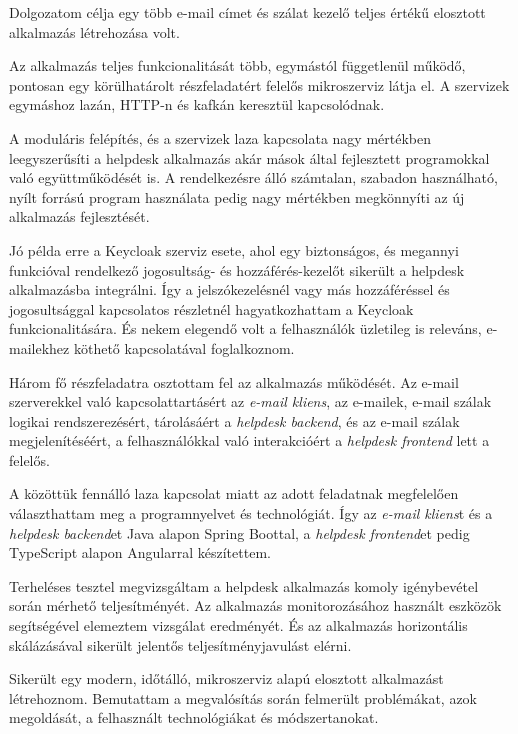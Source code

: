 Dolgozatom célja egy több e-mail címet és szálat kezelő teljes értékű elosztott alkalmazás létrehozása volt.

\bigskip
Az alkalmazás teljes funkcionalitását több, egymástól függetlenül működő, pontosan egy körülhatárolt részfeladatért felelős mikroszerviz látja el. A szervizek egymáshoz lazán, HTTP-n és kafkán keresztül kapcsolódnak.

A moduláris felépítés, és a szervizek laza kapcsolata nagy mértékben leegyszerűsíti a helpdesk alkalmazás akár mások által fejlesztett programokkal való együttműködését is. A rendelkezésre álló számtalan, szabadon használható, nyílt forrású program használata pedig nagy mértékben megkönnyíti az új alkalmazás fejlesztését.

Jó példa erre a Keycloak szerviz esete, ahol egy biztonságos, és megannyi funkcióval rendelkező jogosultság- és hozzáférés-kezelőt sikerült a helpdesk alkalmazásba integrálni. Így a jelszókezelésnél vagy más hozzáféréssel és jogosultsággal kapcsolatos részletnél hagyatkozhattam a Keycloak funkcionalitására. És nekem elegendő volt a felhasználók üzletileg is releváns, e-mailekhez köthető kapcsolatával foglalkoznom.

\bigskip
Három fő részfeladatra osztottam fel az alkalmazás működését. Az e-mail szerverekkel való kapcsolattartásért az \textit{e-mail kliens}, az e-mailek, e-mail szálak logikai rendszerezésért, tárolásáért a \textit{helpdesk backend}, és az e-mail szálak megjelenítéséért, a felhasználókkal való interakcióért a \textit{helpdesk frontend} lett a felelős.

A közöttük fennálló laza kapcsolat miatt az adott feladatnak megfelelően választhattam meg a programnyelvet és technológiát. Így az \textit{e-mail kliens}t és a \textit{helpdesk backend}et Java alapon Spring Boottal, a \textit{helpdesk frontend}et pedig TypeScript alapon Angularral készítettem.


\bigskip
Terheléses tesztel megvizsgáltam a helpdesk alkalmazás komoly igénybevétel során mérhető teljesítményét. Az alkalmazás monitorozásához használt eszközök segítségével elemeztem vizsgálat eredményét. És az alkalmazás horizontális skálázásával sikerült jelentős teljesítményjavulást elérni.

\bigskip
\bigskip
Sikerült egy modern, időtálló, mikroszerviz alapú elosztott alkalmazást létrehoznom. Bemutattam a megvalósítás során felmerült problémákat, azok megoldását, a felhasznált technológiákat és módszertanokat.

